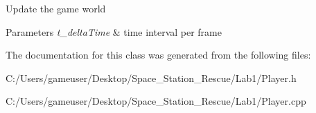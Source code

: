 Update the game world 


\begin{DoxyParams}{Parameters}
{\em t\+\_\+delta\+Time} & time interval per frame\\
\hline
\end{DoxyParams}


The documentation for this class was generated from the following files\+:\begin{DoxyCompactItemize}
\item 
C\+:/\+Users/gameuser/\+Desktop/\+Space\+\_\+\+Station\+\_\+\+Rescue/\+Lab1/Player.\+h\item 
C\+:/\+Users/gameuser/\+Desktop/\+Space\+\_\+\+Station\+\_\+\+Rescue/\+Lab1/Player.\+cpp\end{DoxyCompactItemize}

